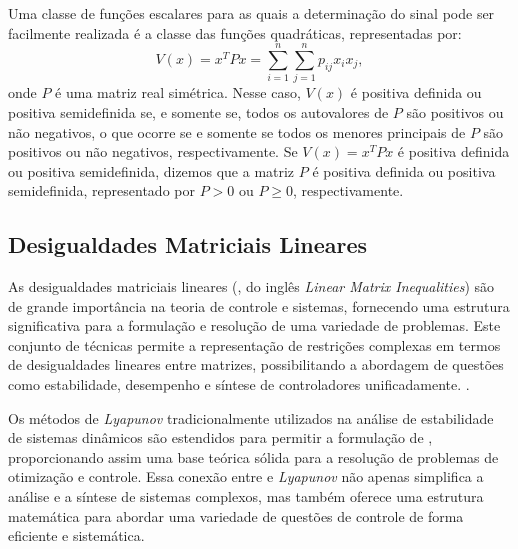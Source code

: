 Uma classe de funções escalares para as quais a determinação do sinal pode ser facilmente realizada é a classe das funções quadráticas, representadas por: \begin{equation}
  V(x) = x^T P x = \sum_{i=1}^n \sum_{j=1}^n p_{ij} x_i x_j,
  \label{eq:lyapunov4}
\end{equation} onde $P$ é uma matriz real simétrica. Nesse caso, $V(x)$ é positiva definida ou positiva semidefinida se, e somente se, todos os autovalores de $P$ são positivos ou não negativos, o que ocorre se e somente se todos os menores principais de $P$ são positivos ou não negativos, respectivamente. Se $V(x) = x^T P x$ é positiva definida ou positiva semidefinida, dizemos que a matriz $P$ é positiva definida ou positiva semidefinida, representado por $P > 0$ ou $P \geq 0$, respectivamente.

\subsection{Desigualdades Matriciais Lineares}

As desigualdades matriciais lineares (, do inglês \textit{Linear Matrix Inequalities}) são de grande importância na teoria de controle e sistemas, fornecendo uma estrutura significativa para a formulação e resolução de uma variedade de problemas. Este conjunto de técnicas permite a representação de restrições complexas em termos de desigualdades lineares entre matrizes, possibilitando a abordagem de questões como estabilidade, desempenho e síntese de controladores unificadamente. \citep{boyd1994}.

Os métodos de \textit{Lyapunov }tradicionalmente utilizados na análise de estabilidade de sistemas dinâmicos são estendidos para permitir a formulação de , proporcionando assim uma base teórica sólida para a resolução de problemas de otimização e controle. Essa conexão entre  e \textit{Lyapunov }não apenas simplifica a análise e a síntese de sistemas complexos, mas também oferece uma estrutura matemática para abordar uma variedade de questões de controle de forma eficiente e sistemática.

